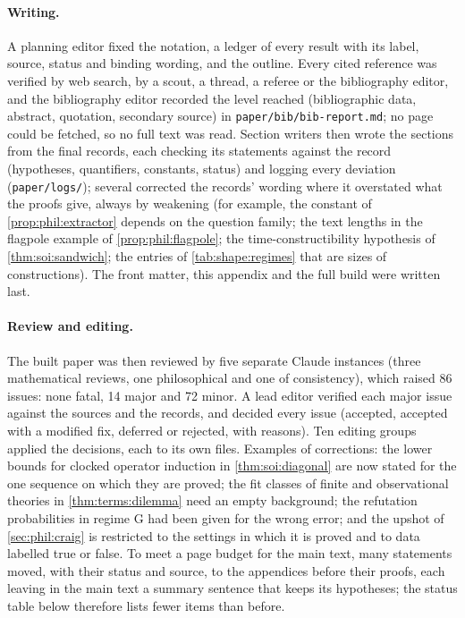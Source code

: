 \paragraph{Writing.} A planning editor fixed the notation, a ledger of every result with its label, source, status and binding wording, and the outline. Every cited reference was verified by web search, by a scout, a thread, a referee or the bibliography editor, and the bibliography editor recorded the level reached (bibliographic data, abstract, quotation, secondary source) in \texttt{paper/bib/bib-report.md}; no page could be fetched, so no full text was read. Section writers then wrote the sections from the final records, each checking its statements against the record (hypotheses, quantifiers, constants, status) and logging every deviation (\texttt{paper/logs/}); several corrected the records' wording where it overstated what the proofs give, always by weakening (for example, the constant of \cref{prop:phil:extractor} depends on the question family; the text lengths in the flagpole example of \cref{prop:phil:flagpole}; the time-constructibility hypothesis of \cref{thm:soi:sandwich}; the entries of \cref{tab:shape:regimes} that are sizes of constructions). The front matter, this appendix and the full build were written last.

\paragraph{Review and editing.} The built paper was then reviewed by five separate Claude instances (three mathematical reviews, one philosophical and one of consistency), which raised 86 issues: none fatal, 14 major and 72 minor. A lead editor verified each major issue against the sources and the records, and decided every issue (accepted, accepted with a modified fix, deferred or rejected, with reasons). Ten editing groups applied the decisions, each to its own files. Examples of corrections: the lower bounds for clocked operator induction in \cref{thm:soi:diagonal} are now stated for the one sequence on which they are proved; the fit classes of finite and observational theories in \cref{thm:terms:dilemma} need an empty background; the refutation probabilities in regime G had been given for the wrong error; and the upshot of \cref{sec:phil:craig} is restricted to the settings in which it is proved and to data labelled true or false. To meet a page budget for the main text, many statements moved, with their status and source, to the appendices before their proofs, each leaving in the main text a summary sentence that keeps its hypotheses; the status table below therefore lists fewer items than before.

